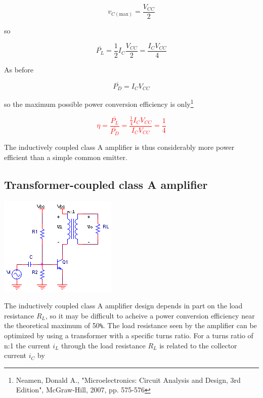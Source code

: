\begin{equation}
v_{C(\text{max})} = \frac{V_{CC}}{2}
\end{equation}

so

\begin{equation}
\overline{P_{L}} = \frac{1}{2}I_{C}\frac{V_{CC}}{2} = \frac{I_{C}V_{CC}}{4}
\end{equation}

As before

\begin{equation}
\overline{P_{D}} = I_{C}V_{CC}
\end{equation}

so the maximum possible power conversion efficiency is only\footnote{Neamen, Donald A., "Microelectronics: Circuit Analysis and Design, 3rd Edition", McGraw-Hill, 2007, pp. 575-576}

\textcolor{red}{
\begin{equation}
\eta = \frac{\overline{P_{L}}}{\overline{P_{D}}} = \frac{\frac{1}{4}I_{C}V_{CC}}{I_{C}V_{CC}} = \frac{1}{4}
\end{equation}
}

The inductively coupled class A amplifier is thus considerably more power efficient than a simple common emitter.

\subsection{Transformer-coupled class A amplifier}
\begin{center}
		\includegraphics{schematics/transformercommonemitter.png}
\end{center}
The inductively coupled class A amplifier design depends in part on the load resistance $R_{L}$, so it may be difficult to acheive a power conversion efficiency near the theoretical maximum of 50\verb#%#. The load resistance seen by the amplifier can be optimized by using a transformer with a specific turns ratio. For a turns ratio of n:1 the current $i_{L}$ through the load resistance $R_{L}$ is related to the collector current $i_{C}$ by

